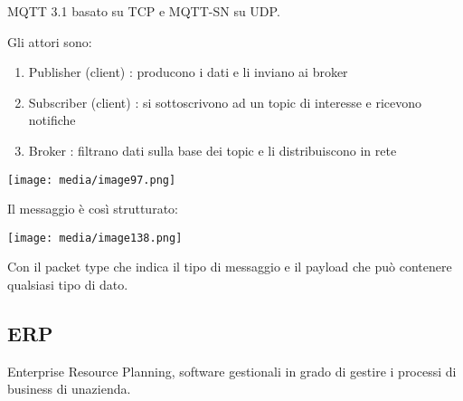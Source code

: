 MQTT 3.1 basato su TCP e MQTT-SN su UDP.

Gli attori sono:

\begin{enumerate}
\def\labelenumi{\arabic{enumi}.}
\item
  Publisher (client) : producono i dati e li inviano ai broker
\item
  Subscriber (client) : si sottoscrivono ad un topic di interesse e
  ricevono notifiche
\item
  Broker : filtrano dati sulla base dei topic e li distribuiscono in
  rete
\end{enumerate}

\texttt{[image: media/image97.png]}

Il messaggio è così strutturato:

\texttt{[image: media/image138.png]}

Con il packet type che indica il tipo di messaggio e il payload che può
contenere qualsiasi tipo di dato.

\subsection{ERP}\label{erp}

Enterprise Resource Planning, software gestionali in grado di gestire i
processi di business di un\textquotesingle azienda.
